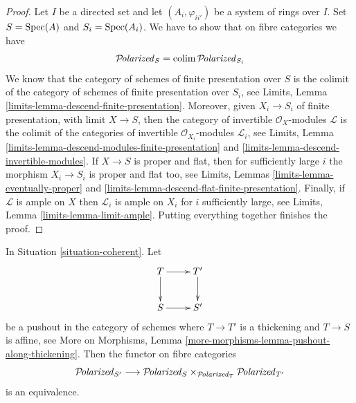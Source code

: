 \begin{proof}
Let $I$ be a directed set and let $(A_i, \varphi_{ii'})$
be a system of rings over $I$. Set $S = \mathop{\mathrm{Spec}}(A)$ and
$S_i = \mathop{\mathrm{Spec}}(A_i)$. We have to show that on fibre categories we have
$$
\mathcal{P}\!\mathit{olarized}_S = \mathop{\mathrm{colim}}\nolimits \mathcal{P}\!\mathit{olarized}_{S_i}
$$
We know that the category of schemes of finite presentation over
$S$ is the colimit of the category of schemes of finite presentation
over $S_i$, see
Limits, Lemma \ref{limits-lemma-descend-finite-presentation}.
Moreover, given $X_i \to S_i$ of finite presentation, with
limit $X \to S$, then the category of invertible
$\mathcal{O}_X$-modules $\mathcal{L}$ is the colimit of the categories
of invertible $\mathcal{O}_{X_i}$-modules $\mathcal{L}_i$, see
Limits, Lemma \ref{limits-lemma-descend-modules-finite-presentation} and
\ref{limits-lemma-descend-invertible-modules}.
If $X \to S$ is proper and flat, then for sufficiently large
$i$ the morphism $X_i \to S_i$ is proper and flat too, see
Limits, Lemmas \ref{limits-lemma-eventually-proper} and
\ref{limits-lemma-descend-flat-finite-presentation}.
Finally, if $\mathcal{L}$ is ample on $X$
then $\mathcal{L}_i$ is ample on $X_i$ for
$i$ sufficiently large, see
Limits, Lemma \ref{limits-lemma-limit-ample}.
Putting everything together finishes the proof.
\end{proof}

\begin{lemma}
\label{lemma-polarized-RS-star}
In Situation \ref{situation-coherent}. Let
$$
\xymatrix{
T \ar[r] \ar[d] & T' \ar[d] \\
S \ar[r] & S'
}
$$
be a pushout in the category of schemes where
$T \to T'$ is a thickening and $T \to S$ is affine, see
More on Morphisms, Lemma \ref{more-morphisms-lemma-pushout-along-thickening}.
Then the functor on fibre categories
$$
\mathcal{P}\!\mathit{olarized}_{S'}
\longrightarrow
\mathcal{P}\!\mathit{olarized}_S \times_{\mathcal{P}\!\mathit{olarized}_T} \mathcal{P}\!\mathit{olarized}_{T'}
$$
is an equivalence.
\end{lemma}

